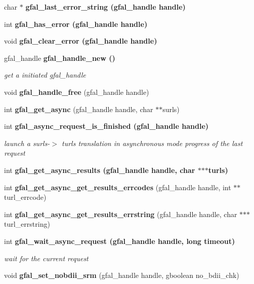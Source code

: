 \begin{CompactItemize}
\item 
char $\ast$ \bf{gfal\_\-last\_\-error\_\-string} (gfal\_\-handle handle)
\item 
int \bf{gfal\_\-has\_\-error} (gfal\_\-handle handle)
\item 
void \bf{gfal\_\-clear\_\-error} (gfal\_\-handle handle)
\item 
gfal\_\-handle \bf{gfal\_\-handle\_\-new} ()
\begin{CompactList}\small\item\em get a initiated gfal\_\-handle \item\end{CompactList}\item 
void \textbf{gfal\_\-handle\_\-free} (gfal\_\-handle handle)\label{gfal__common__interface_8h_0071cb3665f7dca9648fa46bebeca524}

\item 
int \textbf{gfal\_\-get\_\-async} (gfal\_\-handle handle, char $\ast$$\ast$surls)\label{gfal__common__interface_8h_68ef05f37b4971c8306b1cc6ee529647}

\item 
int \bf{gfal\_\-async\_\-request\_\-is\_\-finished} (gfal\_\-handle handle)
\begin{CompactList}\small\item\em launch a surls-$>$ turls translation in asynchronous mode progress of the last request \item\end{CompactList}\item 
int \bf{gfal\_\-get\_\-async\_\-results} (gfal\_\-handle handle, char $\ast$$\ast$$\ast$turls)
\item 
int \textbf{gfal\_\-get\_\-async\_\-get\_\-results\_\-errcodes} (gfal\_\-handle handle, int $\ast$$\ast$turl\_\-errcode)\label{gfal__common__interface_8h_a3161f12f9d5c8151f44df4f132602cb}

\item 
int \textbf{gfal\_\-get\_\-async\_\-get\_\-results\_\-errstring} (gfal\_\-handle handle, char $\ast$$\ast$$\ast$turl\_\-errstring)\label{gfal__common__interface_8h_ecd7d68b18088ff620d21dbef85862ae}

\item 
int \bf{gfal\_\-wait\_\-async\_\-request} (gfal\_\-handle handle, long timeout)
\begin{CompactList}\small\item\em wait for the current request \item\end{CompactList}\item 
void \textbf{gfal\_\-set\_\-nobdii\_\-srm} (gfal\_\-handle handle, gboolean no\_\-bdii\_\-chk)\label{gfal__common__interface_8h_5e3afd0690b23dedf14d6fa7898f28a9}


\end{CompactItemize}
